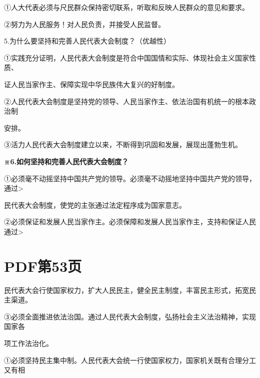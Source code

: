 \documentclass[lang=cn,11pt]{elegantbook}
\newcommand{\daofasym}[1]{{\daofasymbolfont #1}}
\newcommand{\daofasym}[1]{#1}
\begin{document}
\daofasym{①}人大代表必须与尺民群众保持密切联系，听取和反映人民群众的意见和要求。\par

\daofasym{②}努力为人民服务！对人民负责，并接受人民监督。\par

5.为什么要坚持和完善人民代表大会制度？（优越性）\par

\daofasym{①}实践充分证明，人民代表大会制度是符合中国国情和实际、体现社会主义国家性质、\par

证人民当家作主、保障实现中华民族伟大复兴的好制度。\par

\daofasym{②}人民代表大会制度是坚持党的领导、人民当家作主、依法治国有机统一的根本政治制\par

安排。\par

\daofasym{③}活力人民代表大会制度建立以来，不断得到巩固和发展，展现出蓬勃生机。\par

\textbf{※6.如何坚持和完善人民代表大会制度？}\par

\daofasym{①}必须毫不动摇坚持中国共产党的领导。必须毫不动摇地坚持中国共产党的领导，通过>\par

民代表大会制度，使党的主张通过法定程序成为国家意志。\par

\daofasym{②}必须保证和发展人民当家作主。必须保障和发展人民当家作主，支持和保证人民通过>\par


\section*{PDF第53页}

民代表大会行使国家权力，扩大人民民主，健全民主制度，丰富民主形式，拓宽民主渠道。\par

\daofasym{③}必须全面推进依法治国。通过人民代表大会制度，弘扬社会主义法治精神，实现国家各\par

项工作法治化。\par

\daofasym{①}必须坚持民主集中制。人民代表大会统一行使国家权力，国家机关既有合理分工又有相\par
\end{document}
